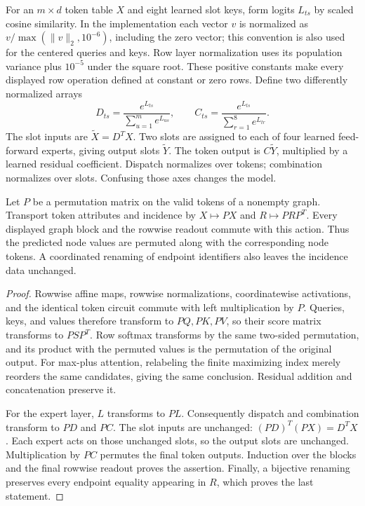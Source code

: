 For an $m\times d$ token table $X$ and eight learned slot keys, form logits
$L_{ts}$ by scaled cosine similarity. In the implementation each vector
$v$ is normalized as $v/\max(\|v\|_2,10^{-6})$, including the zero vector;
this convention is also used for the centered queries and keys. Row layer
normalization uses its population variance plus $10^{-5}$ under the square
root. These positive constants make every displayed row operation defined
at constant or zero rows. Define two differently normalized
arrays
\[
 D_{ts}=\frac{e^{L_{ts}}}{\sum_{u=1}^m e^{L_{us}}},\qquad
 C_{ts}=\frac{e^{L_{ts}}}{\sum_{r=1}^8 e^{L_{tr}}}.
\]
The slot inputs are $\widetilde X=D^TX$. Two slots are assigned to each
of four learned feed-forward experts, giving output slots
$\widetilde Y$. The token output is $C\widetilde Y$, multiplied by a
learned residual coefficient. Dispatch normalizes over tokens; combination
normalizes over slots. Confusing those axes changes the model.
\cite{qtSoftMoE}

\begin{proposition}
\label{qt:equivariance}
Let $P$ be a permutation matrix on the valid tokens of a nonempty graph.
Transport token attributes and incidence by $X\mapsto PX$ and
$R\mapsto PRP^T$. Every displayed graph block and the rowwise readout
commute with this action. Thus the predicted node values are permuted
along with the corresponding node tokens. A coordinated renaming of
endpoint identifiers also leaves the incidence data unchanged.
\end{proposition}
\begin{proof}
Rowwise affine maps, rowwise normalizations, coordinatewise activations,
and the identical token circuit commute with left multiplication by $P$.
Queries, keys, and values therefore transform to $PQ,PK,PV$, so their
score matrix transforms to $PSP^T$. Row softmax transforms by the same
two-sided permutation, and its product with the permuted values is the
permutation of the original output. For max-plus attention, relabeling
the finite maximizing index merely reorders the same candidates, giving
the same conclusion. Residual addition and concatenation preserve it.

For the expert layer, $L$ transforms to $PL$. Consequently dispatch and
combination transform to $PD$ and $PC$. The slot inputs are unchanged:
$(PD)^T(PX)=D^TX$. Each expert acts on those unchanged slots, so the
output slots are unchanged. Multiplication by $PC$ permutes the final
token outputs. Induction over the blocks and the final rowwise readout
proves the assertion. Finally, a bijective renaming preserves every
endpoint equality appearing in $R$, which proves the last statement.
\end{proof}

